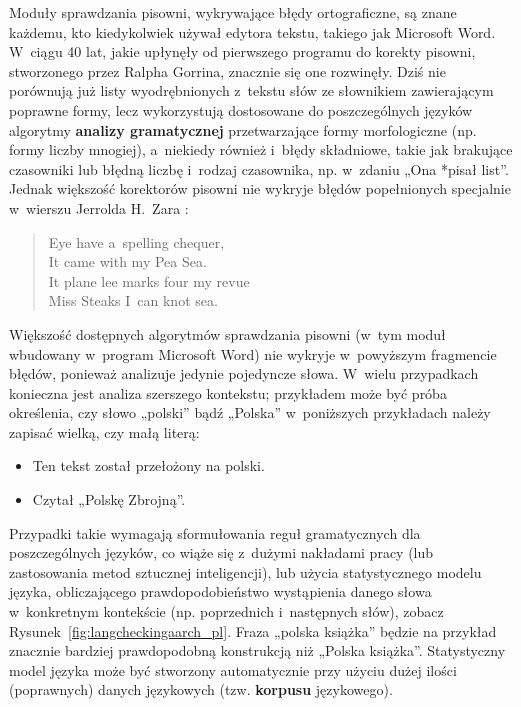 \begin{multicols}{2}
Moduły sprawdzania pisowni, wykrywające błędy ortograficzne, są
znane każdemu, kto kiedykolwiek używał edytora tekstu, takiego jak
Microsoft Word. W~ciągu 40 lat, jakie upłynęły od pierwszego
programu do korekty pisowni, stworzonego przez Ralpha Gorrina,
znacznie się one rozwinęły. Dziś nie porównują już listy
wyodrębnionych z~tekstu słów ze słownikiem zawierającym poprawne
formy, lecz wykorzystują dostosowane do poszczególnych języków
algorytmy \textbf{analizy gramatycznej} przetwarzające formy
morfologiczne (np. formy liczby mnogiej), a~niekiedy również
i~błędy składniowe, takie jak brakujące czasowniki lub błędną
liczbę i~rodzaj czasownika, np. w~zdaniu „Ona *pisał list”.
Jednak większość korektorów pisowni nie wykryje błędów
popełnionych specjalnie w~wierszu Jerrolda H.~Zara \cite{zar1}: 

\begin{verse} Eye have a~spelling chequer,\\
It came with my Pea Sea.\\
It plane lee marks four my revue\\
Miss Steaks I~can knot sea. \end{verse} 

Większość dostępnych algorytmów sprawdzania pisowni (w~tym moduł
wbudowany w~program Microsoft Word) nie wykryje w~powyższym
fragmencie błędów, ponieważ analizuje jedynie pojedyncze słowa.
W~wielu przypadkach konieczna jest analiza szerszego kontekstu;
przykładem może być próba określenia, czy słowo „polski”
bądź „Polska” w~poniższych przykładach należy zapisać
wielką, czy małą literą: 

\begin{itemize} \item Ten tekst został przełożony na polski. \item
Czytał „Polskę Zbrojną”. \end{itemize} 

Przypadki takie wymagają sformułowania reguł gramatycznych dla
poszczególnych języków, co wiąże się z~dużymi nakładami pracy
(lub zastosowania metod sztucznej inteligencji), lub użycia
statystycznego modelu języka, obliczającego prawdopodobieństwo
wystąpienia danego słowa w~konkretnym kontekście (np. poprzednich
i~następnych słów), zobacz Rysunek~\ref{fig:langcheckingaarch_pl}.
Fraza „polska książka” będzie na przykład znacznie bardziej
prawdopodobną konstrukcją niż „Polska książka”. Statystyczny
model języka może być stworzony automatycznie przy użyciu dużej
ilości (poprawnych) danych językowych (tzw. \textbf{korpusu}
językowego). 


\end{multicols}
